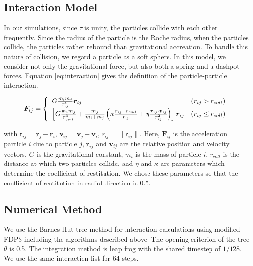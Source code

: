 \documentclass[]{pasj01}
\begin{document}
\subsection{Interaction Model}

In our simulations, since $\tau$ is unity, the particles collide with
each other frequently. Since the radius of the particle is the Roche
radius, when the particles collide, the particles rather rebound than
gravitational accreation. To handle this nature of collision, we
regard a particle as a soft sphere. In this model, we consider not
only the gravitational force, but also both a spring and a dashpot
forces. Equation \ref{eq:interaction} gives the definition of the
particle-particle interaction.

\begin{eqnarray}
  \bm F_{ij} = \left \{
  \begin{array}{ll}
     G \frac{m_i m_j}{r_{ij}^3} \bm r_{ij} & \left(r_{ij} > r_{\rm coll} \right) \\
     \left[  G \frac{m_i m_j} {r_{\rm coll}^3} + \frac{m_j}{m_i + m_j} \left( \kappa \frac{ r_{ij} - r_{\rm coll}}{r_{ij}} + \eta \frac{\bm r_{ij} \cdot \bm v_{ij}}{r_{ij}^2} \right) \right] \bm r_{ij} & \left( r_{ij} \le r_{\rm coll} \right)
  \end{array}
  \right.
  \label{eq:interaction} 
\end{eqnarray}

with $\bm r_{ij} = \bm r_j - \bm r_i$, $\bm v_{ij} = \bm v_j - \bm
v_i$, $r_{ij} = \| \bm r_{ij} \|$. Here, ${\mathbf F_{ij}}$ is the
acceleration particle $i$ due to particle $j$, ${\mathbf r_{ij}}$ and
${\mathbf v_{ij}}$ are the relative position and velocity vectors, $G$
is the gravitational constant, $m_i$ is the mass of particle $i$,
$r_{coll}$ is the distance at which two particles collide, and $\eta$
and $\kappa$ are parameters which determine the coefficient of
restitution. We chose these parameters so that the coefficient of
restitution in radial direction is 0.5.

\subsection{Numerical Method}

We use the Barnes-Hut tree method for interaction calculations using
modified FDPS including the algorithms described above. The opening
criterion of the tree $\theta$ is 0.5. The integration method is leap
frog with the shared timestep of $1/128$. We use the same interaction
list for 64 steps.
\end{document}
